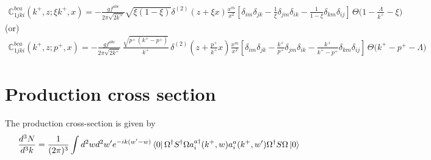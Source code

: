 \documentclass[aps,prd,amsmath,amssymb,nofootinbib]{revtex4-2}
\def\mf#1{\mathbb{#1}}
\numberwithin{equation}{section}
\begin{document}
\begin{align}
   \mf{C}^{bca}_{1jki}(k^{+},z; \xi k^{+},x) = -\frac{gf^{abc}}{2\pi \sqrt{2k^{+}}}\sqrt{\xi(1-\xi)} \delta^{(2)}(z+\xi x)\frac{x^{m}}{x^{2}}\left[ \delta_{im} \delta_{jk}
     - \frac{1}{\xi}\delta_{jm} \delta_{ik}
   - \frac{1}{1-\xi} \delta_{km}\delta_{ij}
 \right]\,\Theta\bigg(1-\frac{\Lambda}{k^{+}}-\xi\bigg)
\end{align}
(or)
\begin{align}
   \mf{C}^{bca}_{1jki}(k^{+},z; p^{+},x) = -\frac{gf^{abc}}{2\pi \sqrt{2k^{+}}}\,\frac{\sqrt{p^{+}\,(k^{+}-p^{+})}}{k^{+}}\, \delta^{(2)}\left(z+\frac{p^{+}}{k^{+}} x\right)\frac{x^{m}}{x^{2}}\left[ \delta_{im} \delta_{jk}
     - \frac{k^{+}}{p^{+}}\delta_{jm} \delta_{ik}
   - \frac{k^{+}}{k^{+}-p^{+}} \delta_{km}\delta_{ij}
 \right]\,\Theta\bigg(k^{+}-p^{+}-\Lambda\bigg)
\end{align}


\section{Production cross section}

The production cross-section is given by 
\begin{equation}
\frac{d^3  N}{d^3 k} = \frac{1}{(2\pi)^{3}} \int d^{2}w d^{2} w^\prime 
e^{-ik (w^{\prime}-w)}
\bra{0}\Omega^{\dagger} S^{\dagger}\Omega a^{a\dagger}_{i}(k^{+},w) 
a^{a}_{i} (k^{+} , w^\prime) \Omega^{\dagger} S\Omega\ket{0}
\end{equation}
\end{document}
